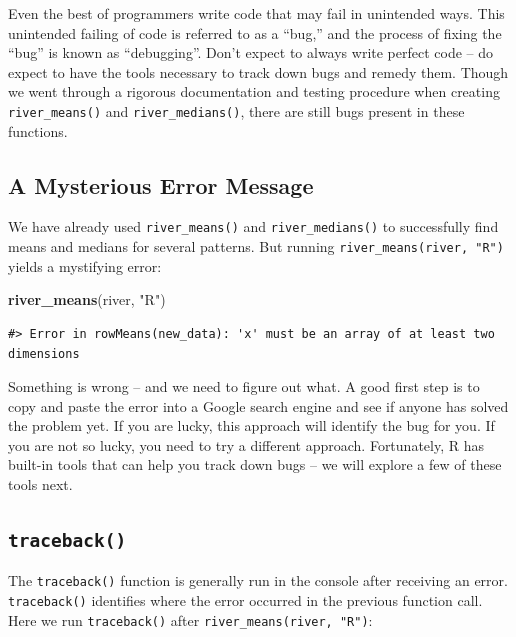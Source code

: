 \documentclass[
]{book}
\newenvironment{Shaded}{\begin{snugshade}}{\end{snugshade}}
\newcommand{\KeywordTok}[1]{\textcolor[rgb]{0.13,0.29,0.53}{\textbf{#1}}}
\newcommand{\NormalTok}[1]{#1}
\newcommand{\StringTok}[1]{\textcolor[rgb]{0.31,0.60,0.02}{#1}}
\begin{document}
Even the best of programmers write code that may fail in unintended ways. This unintended failing of code is referred to as a ``bug,'' and the process of fixing the ``bug'' is known as ``debugging''. Don't expect to always write perfect code -- do expect to have the tools necessary to track down bugs and remedy them. Though we went through a rigorous documentation and testing procedure when creating \texttt{river\_means()} and \texttt{river\_medians()}, there are still bugs present in these functions.

\hypertarget{error-onematch}{%
\subsection{A Mysterious Error Message}\label{error-onematch}}

We have already used \texttt{river\_means()} and \texttt{river\_medians()} to successfully find means and medians for several patterns. But running \texttt{river\_means(river,\ "R")} yields a mystifying error:

\begin{Shaded}
\begin{Highlighting}[]
\KeywordTok{river_means}\NormalTok{(river, }\StringTok{"R"}\NormalTok{)}
\end{Highlighting}
\end{Shaded}

\begin{verbatim}
#> Error in rowMeans(new_data): 'x' must be an array of at least two dimensions
\end{verbatim}

Something is wrong -- and we need to figure out what. A good first step is to copy and paste the error into a Google search engine and see if anyone has solved the problem yet. If you are lucky, this approach will identify the bug for you. If you are not so lucky, you need to try a different approach. Fortunately, R has built-in tools that can help you track down bugs -- we will explore a few of these tools next.

\hypertarget{traceback}{%
\subsection{\texorpdfstring{\texttt{traceback()}}{traceback()}}\label{traceback}}

The \texttt{traceback()} function is generally run in the console after receiving an error. \texttt{traceback()} identifies where the error occurred in the previous function call. Here we run \texttt{traceback()} after \texttt{river\_means(river,\ "R")}:
\end{document}
